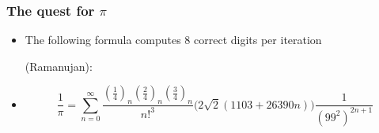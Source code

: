\documentclass{beamer}
\begin{document}
\begin{frame} 

\frametitle{The quest for $\pi$} 

\begin{itemize} 

\item The following formula computes $8$ correct digits per iteration 

(Ramanujan): \pause 

\item 

\begin{small} 

\begin{equation*} 

\frac{1}{\pi}=\sum_{n=0}^\infty 

\frac{(\frac{1}{4})_n(\frac{2}{4})_n(\frac{3}{4})_n}{n!^3} 

\bigl(2\sqrt{2}(1103+26390n)\bigr)\frac{1}{(99^2)^{2n+1}} 

\end{equation*} 

\end{small} 

\end{itemize} 



\end{frame} 





% 






% 
\end{document}
